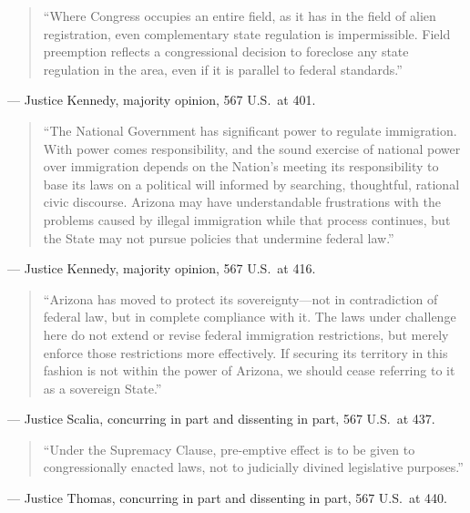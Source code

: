 \documentclass[12pt]{article}
\begin{document}
\begin{quote}
``Where Congress occupies an entire field, as it has in the field of alien registration, even complementary state regulation is impermissible. Field preemption reflects a congressional decision to foreclose any state regulation in the area, even if it is parallel to federal standards.''
\end{quote}
\noindent --- Justice Kennedy, majority opinion, 567 U.S.\ at 401.

\begin{quote}
``The National Government has significant power to regulate immigration. With power comes responsibility, and the sound exercise of national power over immigration depends on the Nation's meeting its responsibility to base its laws on a political will informed by searching, thoughtful, rational civic discourse. Arizona may have understandable frustrations with the problems caused by illegal immigration while that process continues, but the State may not pursue policies that undermine federal law.''
\end{quote}
\noindent --- Justice Kennedy, majority opinion, 567 U.S.\ at 416.

\begin{quote}
``Arizona has moved to protect its sovereignty---not in contradiction of federal law, but in complete compliance with it. The laws under challenge here do not extend or revise federal immigration restrictions, but merely enforce those restrictions more effectively. If securing its territory in this fashion is not within the power of Arizona, we should cease referring to it as a sovereign State.''
\end{quote}
\noindent --- Justice Scalia, concurring in part and dissenting in part, 567 U.S.\ at 437.

\begin{quote}
``Under the Supremacy Clause, pre-emptive effect is to be given to congressionally enacted laws, not to judicially divined legislative purposes.''
\end{quote}
\noindent --- Justice Thomas, concurring in part and dissenting in part, 567 U.S.\ at 440.
\end{document}
